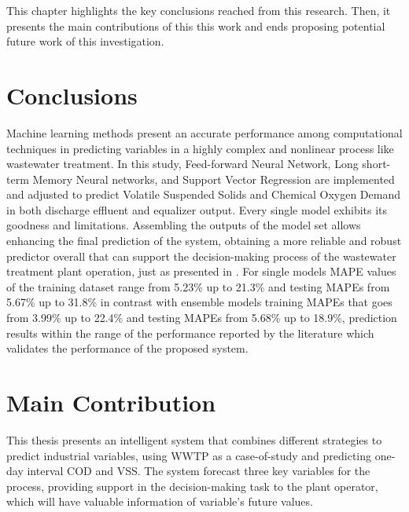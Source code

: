This chapter highlights the key conclusions reached from this research. Then, it presents the main contributions of this this work and ends proposing potential future work of this investigation. 

\section{Conclusions}

Machine learning methods present an accurate performance among computational techniques in predicting variables in a highly complex and nonlinear process like wastewater treatment. In this study, Feed-forward Neural Network, Long short-term Memory Neural networks, and Support Vector Regression are implemented and adjusted to predict Volatile Suspended Solids and Chemical Oxygen Demand in both discharge effluent and equalizer output. Every single model exhibits its goodness and limitations. Assembling the outputs of the model set allows enhancing the final prediction of the system, obtaining a more reliable and robust predictor overall that can support the decision-making process of the wastewater treatment plant operation, just as presented in \cite{Nourani2018}. For single models \ac{MAPE} values of the training dataset range from 5.23\% up to 21.3\% and testing \ac{MAPE}s from 5.67\% up to 31.8\% in contrast with ensemble models training \ac{MAPE}s that goes from 3.99\% up to 22.4\% and testing \ac{MAPE}s from 5.68\% up to 18.9\%, prediction results within the range of the performance reported by the literature which validates the performance of the proposed system.

\section{Main Contribution}

This thesis presents an intelligent system that combines different strategies to predict industrial variables, using WWTP as a case-of-study and predicting one-day interval COD and VSS. The system forecast three key variables for the process, providing support in the decision-making task to the plant operator, which will have valuable information of variable's future values.

